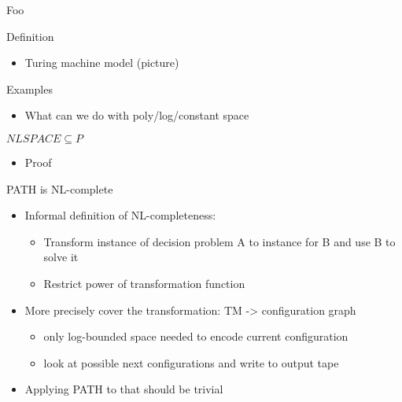 Foo

\begin{frame}{Definition}

\begin{itemize}
\itemsep1pt\parskip0pt
\item
  Turing machine model (picture)
\end{itemize}

\end{frame}

\begin{frame}{Examples}

\begin{itemize}
\itemsep1pt\parskip0pt
\item
  What can we do with poly/log/constant space
\end{itemize}

\end{frame}

\begin{frame}{$NLSPACE \subseteq P$}

\begin{itemize}
\itemsep1pt\parskip0pt
\item
  Proof
\end{itemize}

\end{frame}

\begin{frame}{PATH is NL-complete}

\begin{itemize}
\itemsep1pt\parskip0pt
\item
  Informal definition of NL-completeness:

  \begin{itemize}
  \itemsep1pt\parskip0pt
  \item
    Transform instance of decision problem A to instance for B and use B
    to solve it
  \item
    Restrict power of transformation function
  \end{itemize}
\item
  More precisely cover the transformation: TM -\textgreater{}
  configuration graph

  \begin{itemize}
  \itemsep1pt\parskip0pt
  \item
    only log-bounded space needed to encode current configuration
  \item
    look at possible next configurations and write to output tape
  \end{itemize}
\item
  Applying PATH to that should be trivial
\end{itemize}

\end{frame}

